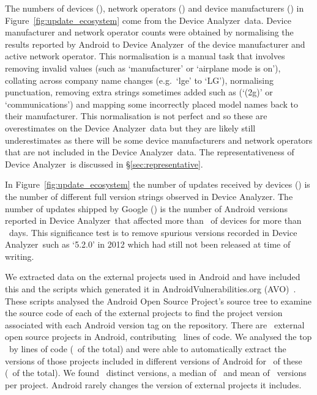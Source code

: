 \documentclass{sig-alternate-2013}
\let\OldTodo\todo
\renewcommand{\todo}{\OldTodo[inline]}
\newcommand{\todolater}[1]{}%
\newcommand{\da}{Device Analyzer}
\newcommand{\avo}{AVO}
\begin{document}
The numbers of devices (\daNumOSDevices), network operators (\daNumOperators) and device manufacturers (\daNumManufacturers) in Figure~\ref{fig:update_ecosystem} come from the \da\ data.
Device manufacturer and network operator counts were obtained by normalising the results reported by Android to \da\ of the device manufacturer and active network operator.
This normalisation is a manual task that involves removing invalid values (such as `manufacturer' or `airplane mode is on'), collating across company name changes (e.g.\ `lge' to `LG'), normalising punctuation, removing extra strings sometimes added such as (`(2g)' or `communications') and mapping some incorrectly placed model names back to their manufacturer.
This normalisation is not perfect and so these are overestimates on the \da\ data but they are likely still underestimates as there will be some device manufacturers and network operators that are not included in the \da\ data.
The representativeness of \da\ is discussed in \S\ref{sec:representative}.

In Figure~\ref{fig:update_ecosystem} the number of updates received by devices (\daNumFullVersions) is the number of different full version strings observed in \da.
The number of updates shipped by Google (\daNumSigOSVersions) is the number of Android versions reported in \da\ that affected more than \daSigVersionPerc\ of devices for more than \daSigVersionDays\ days.
This significance test is to remove spurious versions recorded in \da\ such as `5.2.0' in 2012 which had still not been released at time of writing.\todolater{Check if this has now been released}

We extracted data on the external projects used in Android and have included this and the scripts which generated it in AndroidVulnerabilities.org (\avo)~\cite{androidvulnerabilities.org}.
These scripts analysed the Android Open Source Project's source tree to examine the source code of each of the external projects to find the project version associated with each Android version tag on the repository.
There are \avoNumExternalProjects\ external open source projects in Android, contributing \avoTotalExternalLines\ lines of code.
We analysed the top \avoNumBigExternalProjects\ by lines of code (\avoBigExternalLinesOfCodePerc\ of the total) and were able to automatically extract the versions of those projects included in different versions of Android for \avoNumAnalysedExternalProjects\ of these (\avoAnalysedExternalLinesOfCodePerc\ of the total).
We found \avoBigExternalTotalVersions\ distinct versions, a median of \avoBigExternalMedianVersions\ and mean of \avoBigExternalMeanVersions\ versions per project.
Android rarely changes the version of external projects it includes.
\end{document}
